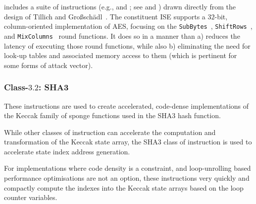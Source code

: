 \XCID includes a suite of instructions 
(e.g.,  and ; see  and )
drawn directly from the design of
Tillich and Gro{\ss}sch\"{a}dl~\cite{SCARV:TilGro:06}.
The constituent ISE supports a $32$-bit, column-oriented implementation 
of AES, focusing on the
{\tt SubBytes}~\cite[Section 5.1.1]{SCARV:FIPS:197},
{\tt ShiftRows}~\cite[Section 5.1.2]{SCARV:FIPS:197}, 
and
{\tt MixColumns}~\cite[Section 5.1.3]{SCARV:FIPS:197}
round functions.  It does so in a manner than 
a) reduces the latency of executing those round functions, 
   while also
b) eliminating the need for look-up tables and associated memory access
   to them (which is pertinent for some forms of attack vector).


\subsubsection{Class-$3.2$: SHA3}
\label{sec:bg:feature:3:2}

These instructions are used to create accelerated, code-dense implementations
of the Keccak family of sponge functions used in the SHA3 hash function.

While other classes of \XCID instruction can accelerate the computation
and transformation of the Keccak state array, the SHA3 class of instruction
is used to accelerate state index address generation.

For implementations where code density is a constraint, and loop-unrolling
based performance optimisations are not an option, these instructions
very quickly and compactly compute the indexes into the Keccak state arrays
based on the loop counter variables.

